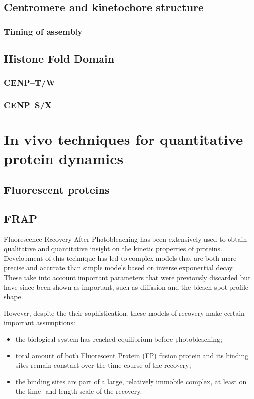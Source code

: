   \subsection{Centromere and kinetochore structure}
    \subsubsection{Timing of assembly}
  \subsection{Histone Fold Domain}
    \subsubsection{CENP--T/W}
    \subsubsection{CENP--S/X}

\section{In vivo techniques for quantitative protein dynamics}
  \subsection{Fluorescent proteins}
  \subsection{FRAP}

    Fluorescence Recovery After Photobleaching has been extensively used to obtain
    qualitative and quantitative insight on the kinetic properties of proteins. Development of
    this technique has led to complex models that are both more precise and accurate than
    simple models based on inverse exponential decay. These take into account important
    parameters that were previously discarded but have since been shown as important, such as
    diffusion and the bleach spot profile shape.

    However, despite the their sophistication, these models of recovery make certain
    important assumptions:
    \begin{itemize}
      \item the biological system has reached equilibrium before photobleaching;
      \item total amount of both Fluorescent Protein (FP) fusion protein and its
            binding sites remain constant over the time course of the recovery;
      \item the binding sites are part of a large, relatively immobile complex, at
            least on the time- and length-scale of the recovery.
    \end{itemize}

